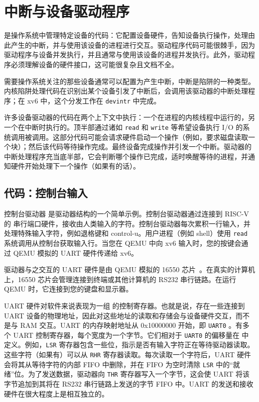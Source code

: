 \chapter{中断与设备驱动程序}
\label{CH:INTERRUPT}

是操作系统中管理特定设备的代码：它配置设备硬件，告知设备执行操作，处理由此产生的中断，并与使用该设备的进程进行交互。驱动程序代码可能很棘手，因为驱动程序与设备并发执行，并且通常与使用该设备的进程并发执行。此外，驱动程序必须理解设备的硬件接口，这可能很复杂且文档不全。

需要操作系统关注的那些设备通常可以配置为产生中断，中断是陷阱的一种类型。内核陷阱处理代码在识别出某个设备引发了中断后，会调用该驱动器的中断处理程序；在 xv6 中，这个分发工作在 {\tt devintr}  中完成。

许多设备驱动器的代码在两个上下文中执行：一个在进程的内核线程中运行的，另一个在中断时执行的。顶半部通过诸如 {\tt read} 和 {\tt write} 等希望设备执行 I/O 的系统调用被调用。这部分代码可能会请求硬件启动一个操作（例如，要求磁盘读取一个块）；然后该代码等待操作完成。最终设备完成操作并引发一个中断。驱动器的中断处理程序充当底半部，它会判断哪个操作已完成，适时唤醒等待的进程，并通知硬件开始处理下一个操作（如果有的话）。

\section{代码：控制台输入}

控制台驱动器  是驱动器结构的一个简单示例。控制台驱动器通过连接到 RISC-V 的  串行端口硬件，接收由人类输入的字符。控制台驱动器每次累积一行输入，并处理特殊输入字符，例如退格键和 control-u。用户进程（例如 shell）使用 {\tt read} 系统调用从控制台获取输入行。当您在 QEMU 中向 xv6 输入时，您的按键会通过 QEMU 模拟的 UART 硬件传递给 xv6。

驱动器与之交互的 UART 硬件是由 QEMU 模拟的 16550 芯片~\cite{ns16550a}。在真实的计算机上，16550 芯片会管理连接到终端或其他计算机的 RS232 串行链路。在运行 QEMU 时，它连接到您的键盘和显示器。

UART 硬件对软件来说表现为一组  的控制寄存器。也就是说，存在一些连接到 UART 设备的物理地址，因此对这些地址的读取和存储会与设备硬件交互，而不是与 RAM 交互。UART 的内存映射地址从 0x10000000 开始，即 {\tt UART0} 。有多个 UART 控制寄存器，每个宽度为一个字节。它们相对于 {\tt UART0} 的偏移量在  中定义。例如，{\tt LSR} 寄存器包含一些位，指示是否有输入字符正在等待驱动器读取。这些字符（如果有）可以从 {\tt RHR} 寄存器读取。每次读取一个字符后，UART 硬件会将其从等待字符的内部 FIFO 中删除，并在 FIFO 为空时清除 {\tt LSR} 中的“就绪”位。为了发送数据，驱动器向 {\tt THR} 寄存器写入一个字节，这会使 UART 将该字节追加到其将在 RS232 串行链路上发送的字节 FIFO 中。UART 的发送和接收硬件在很大程度上是相互独立的。

